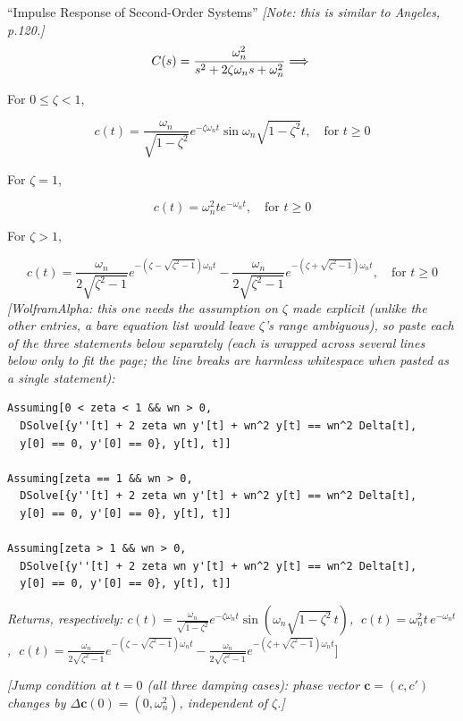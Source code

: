 \documentclass[
  11pt,
]{article}
\providecommand{\implies}{\Longrightarrow}
\begin{document}
``Impulse Response of Second-Order Systems'' \emph{{[}Note: this is
similar to Angeles, p.120.{]}} \[
C(s) = \frac{\omega_n^2}{s^2 + 2\zeta\omega_n s + \omega_n^2} \implies \\
\]

For \(0 \leq \zeta < 1\),

\[
c(t) = \frac{\omega_n}{\sqrt{1 - \zeta^2}} e^{-\zeta \omega_n t} \sin \omega_n \sqrt{1 - \zeta^2} t, \quad \text{for } t \geq 0
\]

For \(\zeta = 1\),

\[
c(t) = \omega_n^2 t e^{-\omega_n t}, \quad \text{for } t \geq 0
\]

For \(\zeta > 1\),

\[
c(t) = \frac{\omega_n}{2 \sqrt{\zeta^2 - 1}} e^{-\left( \zeta - \sqrt{\zeta^2 - 1} \right) \omega_n t} - \frac{\omega_n}{2 \sqrt{\zeta^2 - 1}} e^{-\left( \zeta + \sqrt{\zeta^2 - 1} \right) \omega_n t}, \quad \text{for } t \geq 0
\] \emph{{[}WolframAlpha: this one needs the assumption on \(\zeta\)
made explicit (unlike the other entries, a bare equation list would
leave \(\zeta\)'s range ambiguous), so paste each of the three
statements below separately (each is wrapped across several lines below
only to fit the page; the line breaks are harmless whitespace when
pasted as a single statement):}

\begin{verbatim}
Assuming[0 < zeta < 1 && wn > 0,
  DSolve[{y''[t] + 2 zeta wn y'[t] + wn^2 y[t] == wn^2 Delta[t],
  y[0] == 0, y'[0] == 0}, y[t], t]]

Assuming[zeta == 1 && wn > 0,
  DSolve[{y''[t] + 2 zeta wn y'[t] + wn^2 y[t] == wn^2 Delta[t],
  y[0] == 0, y'[0] == 0}, y[t], t]]

Assuming[zeta > 1 && wn > 0,
  DSolve[{y''[t] + 2 zeta wn y'[t] + wn^2 y[t] == wn^2 Delta[t],
  y[0] == 0, y'[0] == 0}, y[t], t]]
\end{verbatim}

\emph{Returns, respectively:
\(c(t) = \frac{\omega_n}{\sqrt{1-\zeta^2}} e^{-\zeta\omega_n t}\sin\left(\omega_n\sqrt{1-\zeta^2}\,t\right)\),
\(\; c(t) = \omega_n^2 t \, e^{-\omega_n t}\),
\(\; c(t) = \frac{\omega_n}{2\sqrt{\zeta^2-1}} e^{-(\zeta-\sqrt{\zeta^2-1})\omega_n t} - \frac{\omega_n}{2\sqrt{\zeta^2-1}} e^{-(\zeta+\sqrt{\zeta^2-1})\omega_n t}\)}{]}

\emph{{[}Jump condition at \(t=0\) (all three damping cases): phase
vector \(\mathbf c=(c,c')\) changes by
\(\Delta\mathbf c(0)=(0,\omega_n^2)\), independent of \(\zeta\).{]}}
\end{document}
